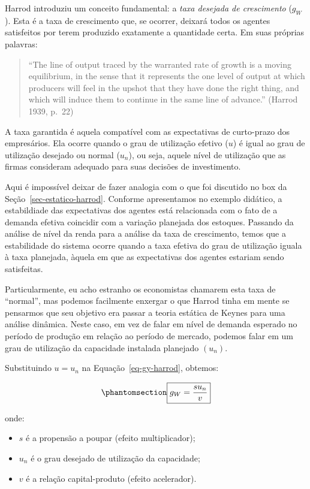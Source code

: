 \documentclass[
  brazilian,
  letterpaper,
  DIV=11,
  numbers=noendperiod]{scrreprt}
\providecommand{\tightlist}{%
  \setlength{\itemsep}{0pt}\setlength{\parskip}{0pt}}
\begin{document}
Harrod introduziu um conceito fundamental: a \emph{taxa desejada de
crescimento} (\(g_W\)). Esta é a taxa de crescimento que, se ocorrer,
deixará todos os agentes satisfeitos por terem produzido exatamente a
quantidade certa. Em suas próprias palavras:

\begin{quote}
``The line of output traced by the warranted rate of growth is a moving
equilibrium, in the sense that it represents the one level of output at
which producers will feel in the upshot that they have done the right
thing, and which will induce them to continue in the same line of
advance.'' (Harrod 1939, p.~22)
\end{quote}

A taxa garantida é aquela compatível com as expectativas de curto-prazo
dos empresários. Ela ocorre quando o grau de utilização efetivo (\(u\))
é igual ao grau de utilização desejado ou normal (\(u_n\)), ou seja,
aquele nível de utilização que as firmas consideram adequado para suas
decisões de investimento.

Aqui é impossível deixar de fazer analogia com o que foi discutido no
box da Seção~\ref{sec-estatico-harrod}. Conforme apresentamos no exemplo
didático, a estabildiade das expectativas dos agentes está relacionada
com o fato de a demanda efetiva coincidir com a variação planejada dos
estoques. Passando da análise de nível da renda para a análise da taxa
de crescimento, temos que a estabilidade do sistema ocorre quando a taxa
efetiva do grau de utilização iguala à taxa planejada, àquela em que as
expectativas dos agentes estariam sendo satisfeitas.

Particularmente, eu acho estranho os economistas chamarem esta taxa de
``normal'', mas podemos facilmente enxergar o que Harrod tinha em mente
se pensarmos que seu objetivo era passar a teoria estática de Keynes
para uma análise dinâmica. Neste caso, em vez de falar em nível de
demanda esperado no período de produção em relação ao período de
mercado, podemos falar em um grau de utilização da capacidade instalada
planejado \((u_n)\).

Substituindo \(u = u_n\) na Equação~\ref{eq-gy-harrod}, obtemos:

\begin{equation}\protect\phantomsection\label{eq-gw-harrod}{\boxed{g_W = \frac{s u_n}{v}}}\end{equation}

onde:

\begin{itemize}
\tightlist
\item
  \(s\) é a propensão a poupar (efeito multiplicador);
\item
  \(u_n\) é o grau desejado de utilização da capacidade;
\item
  \(v\) é a relação capital-produto (efeito acelerador).
\end{itemize}
\end{document}
